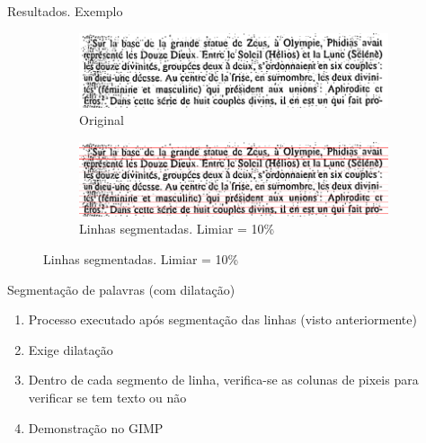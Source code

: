 \documentclass{beamer}
\begin{document}
\begin{frame}[allowframebreaks]{Resultados. Exemplo}
\begin{figure}
    \centering
    \begin{subfigure}[]{\textwidth}
        \centering
        \includegraphics[width=\textwidth]{images/ruido.png}
        \caption{Original}
    \end{subfigure}
    \begin{subfigure}[]{\textwidth}
        \centering
        \includegraphics[width=\textwidth]{images/ruido_lines_10.png}
        \caption{Linhas segmentadas. Limiar = 10\%}
    \end{subfigure}
\end{figure}

\end{frame}

\begin{frame}{Segmentação de palavras (com dilatação)}
    
\begin{enumerate}
    \item Processo executado após segmentação das linhas (visto anteriormente)
    \item Exige dilatação
    \item Dentro de cada segmento de linha, verifica-se as colunas de pixeis para verificar se tem texto ou não
    \item Demonstração no GIMP
\end{enumerate}

\end{frame}
\end{document}
